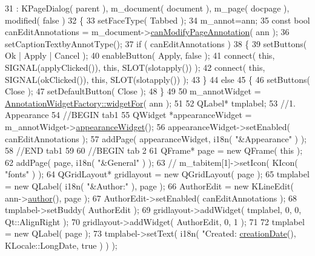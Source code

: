 \begin{DoxyCode}
31     : KPageDialog( parent ), m\_document( document ), m\_page( docpage ), modified( \textcolor{keyword}{false} )
32 \{
33     setFaceType( Tabbed );
34     m\_annot=ann;
35     \textcolor{keyword}{const} \textcolor{keywordtype}{bool} canEditAnnotations = m\_document->\hyperlink{classOkular_1_1Document_acbc3b843b40096c18dbeec805552685a}{canModifyPageAnnotation}( ann );
36     setCaptionTextbyAnnotType();
37     \textcolor{keywordflow}{if} ( canEditAnnotations )
38     \{
39         setButtons( Ok | Apply | Cancel );
40         enableButton( Apply, \textcolor{keyword}{false} );
41         connect( \textcolor{keyword}{this}, SIGNAL(applyClicked()), \textcolor{keyword}{this}, SLOT(slotapply()) );
42         connect( \textcolor{keyword}{this}, SIGNAL(okClicked()), \textcolor{keyword}{this}, SLOT(slotapply()) );
43     \}
44     \textcolor{keywordflow}{else}
45     \{
46         setButtons( Close );
47         setDefaultButton( Close );
48     \}
49 
50     m\_annotWidget = \hyperlink{classAnnotationWidgetFactory_a47ee680b5716e27021cadd0476735e78}{AnnotationWidgetFactory::widgetFor}( ann );
51 
52     QLabel* tmplabel;
53   \textcolor{comment}{//1. Appearance}
54     \textcolor{comment}{//BEGIN tab1}
55     QWidget *appearanceWidget = m\_annotWidget->\hyperlink{classAnnotationWidget_a57411e4d54dde346c8ed57c99da56666}{appearanceWidget}();
56     appearanceWidget->setEnabled( canEditAnnotations );
57     addPage( appearanceWidget, i18n( \textcolor{stringliteral}{"&Appearance"} ) );
58     \textcolor{comment}{//END tab1}
59 
60     \textcolor{comment}{//BEGIN tab 2}
61     QFrame* page = \textcolor{keyword}{new} QFrame( \textcolor{keyword}{this} );
62     addPage( page, i18n( \textcolor{stringliteral}{"&General"} ) );
63 \textcolor{comment}{//    m\_tabitem[1]->setIcon( KIcon( "fonts" ) );}
64     QGridLayout* gridlayout = \textcolor{keyword}{new} QGridLayout( page );
65     tmplabel = \textcolor{keyword}{new} QLabel( i18n( \textcolor{stringliteral}{"&Author:"} ), page );
66     AuthorEdit = \textcolor{keyword}{new} KLineEdit( ann->\hyperlink{classOkular_1_1Annotation_a45682b53c24e4f5d41c547d6e109f6a4}{author}(), page );
67     AuthorEdit->setEnabled( canEditAnnotations );
68     tmplabel->setBuddy( AuthorEdit );
69     gridlayout->addWidget( tmplabel, 0, 0, Qt::AlignRight );
70     gridlayout->addWidget( AuthorEdit, 0, 1 );
71 
72     tmplabel = \textcolor{keyword}{new} QLabel( page );
73     tmplabel->setText( i18n( \textcolor{stringliteral}{"Created: %
      \hyperlink{classOkular_1_1Annotation_ad775b0d2925d50334d46efc1a2689e5b}{creationDate}(), KLocale::LongDate, true ) ) );
}
\end{DoxyCode}
